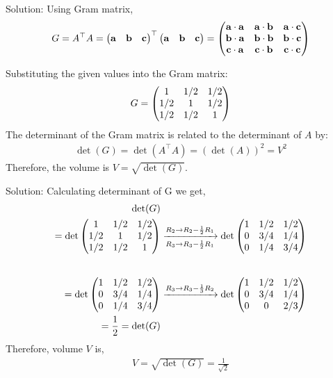 \documentclass{beamer}
\begin{document}
\begin{frame}{Solution: }
Using Gram matrix,  
\begin{align}
    G = A^\top A = 
    \begin{pmatrix}\mathbf{a} & \mathbf{b} & \mathbf{c}\end{pmatrix}^\top
    \begin{pmatrix} \mathbf{a} & \mathbf{b} & \mathbf{c} \end{pmatrix}
    = \begin{pmatrix}\mathbf{a}\cdot\mathbf{a} & \mathbf{a}\cdot\mathbf{b} & \mathbf{a}\cdot\mathbf{c} \\
             \mathbf{b}\cdot\mathbf{a} & \mathbf{b}\cdot\mathbf{b} & \mathbf{b}\cdot\mathbf{c} \\
             \mathbf{c}\cdot\mathbf{a} & \mathbf{c}\cdot\mathbf{b} & \mathbf{c}\cdot\mathbf{c}\end{pmatrix}
\end{align}

Substituting the given values into the Gram matrix:
\begin{align}
    G = \begin{pmatrix}1 & 1/2 & 1/2 \\ 1/2 & 1 & 1/2 \\ 1/2 & 1/2 & 1\end{pmatrix}
\end{align}
The determinant of the Gram matrix is related to the determinant of $A$ by:
\begin{align}
    \det(G) = 
    \det(A^\top A) = (\det(A))^2 = V^2
\end{align}
Therefore, the volume is $V = \sqrt{\det(G)}$.
\end{frame}

\begin{frame}{Solution: }
Calculating determinant of G we get,
\begin{align}
    \det(G) & \\
    =\det\myvec{
1 & 1/2 & 1/2 \\
1/2 & 1 & 1/2 \\
1/2 & 1/2 & 1
}
& \xrightarrow[R_3 \to R_3 - \frac{1}{2}R_1]{R_2 \to R_2 - \frac{1}{2}R_1}
\det\myvec{
1 & 1/2 & 1/2 \\
0 & 3/4 & 1/4 \\
0 & 1/4 & 3/4
}
\\[2em] %
= \det\myvec{
1 & 1/2 & 1/2 \\
0 & 3/4 & 1/4 \\
0 & 1/4 & 3/4
}
& \xrightarrow{R_3 \to R_3 - \frac{1}{3}R_2}
\det\myvec{
1 & 1/2 & 1/2 \\
0 & 3/4 & 1/4 \\
0 & 0 & 2/3
} \\
 = \frac{1}{2} = \det(G)
\end{align}
Therefore, volume $V$ is,
\begin{align}
    V = \sqrt{\det(G)}  = \frac{1}{\sqrt{2}}
\end{align}
\end{frame}
\end{document}
